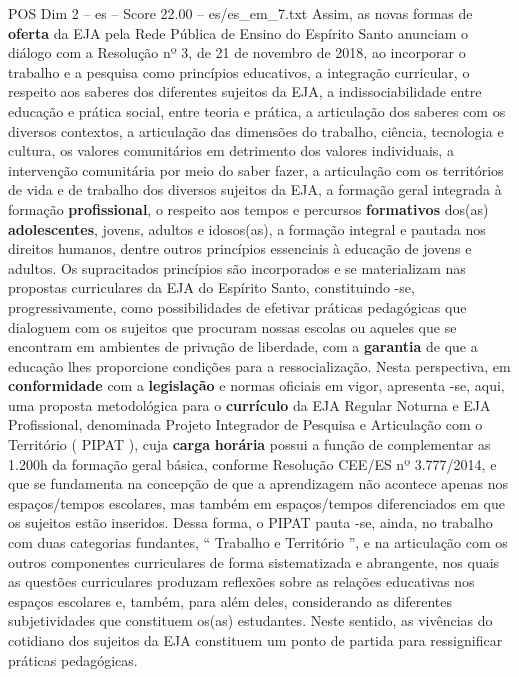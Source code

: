 \begin{textsample}{POS Dim 2 – es – Score 22.00 – es/es\_em\_7.txt}
Assim, as novas formas de \textbf{oferta} da EJA pela Rede Pública de Ensino do Espírito Santo anunciam o diálogo com a Resolução nº 3, de 21 de novembro de 2018, ao incorporar o trabalho e a pesquisa como princípios educativos, a integração curricular, o respeito aos saberes dos diferentes sujeitos da EJA, a indissociabilidade entre educação e prática social, entre teoria e prática, a articulação dos saberes com os diversos contextos, a articulação das dimensões do trabalho, ciência, tecnologia e cultura, os valores comunitários em detrimento dos valores individuais, a intervenção comunitária por meio do saber fazer, a articulação com os territórios de vida e de trabalho dos diversos sujeitos da EJA, a formação geral integrada à formação \textbf{profissional}, o respeito aos tempos e percursos \textbf{formativos} dos(as) \textbf{adolescentes}, jovens, adultos e idosos(as), a formação integral e pautada nos direitos humanos, dentre outros princípios essenciais à educação de jovens e adultos.
Os supracitados princípios são incorporados e se materializam nas propostas curriculares da EJA do Espírito Santo, constituindo -se, progressivamente, como possibilidades de efetivar práticas pedagógicas que dialoguem com os sujeitos que procuram nossas escolas ou aqueles que se encontram em ambientes de privação de liberdade, com a \textbf{garantia} de que a educação lhes proporcione condições para a ressocialização.
Nesta perspectiva, em \textbf{conformidade} com a \textbf{legislação} e normas oficiais em vigor, apresenta -se, aqui, uma proposta metodológica para o \textbf{currículo} da EJA Regular Noturna e EJA Profissional, denominada Projeto Integrador de Pesquisa e Articulação com o Território ( PIPAT ), cuja \textbf{carga} \textbf{horária} possui a função de complementar as 1.200h da formação geral básica, conforme Resolução CEE/ES nº 3.777/2014, e que se fundamenta na concepção de que a aprendizagem não acontece apenas nos espaços/tempos escolares, mas também em espaços/tempos diferenciados em que os sujeitos estão inseridos.
Dessa forma, o PIPAT pauta -se, ainda, no trabalho com duas categorias fundantes, “ Trabalho e Território ”, e na articulação com os outros componentes curriculares de forma sistematizada e abrangente, nos quais as questões curriculares produzam reflexões sobre as relações educativas nos espaços escolares e, também, para além deles, considerando as diferentes subjetividades que constituem os(as) estudantes.
Neste sentido, as vivências do cotidiano dos sujeitos da EJA constituem um ponto de partida para ressignificar práticas pedagógicas.

\end{textsample}
